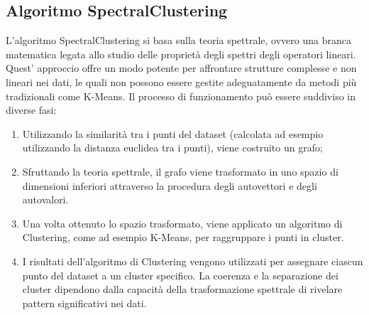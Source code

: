 \documentclass[12pt,oneside]{article}
\begin{document}
    \begin{enumerate}
    \subsection{Algoritmo SpectralClustering}
    \begin{justify}
    L'algoritmo SpectralClustering si basa sulla teoria spettrale, ovvero una branca matematica legata allo studio delle proprietà degli spettri degli operatori lineari. Quest' approccio offre un modo potente per affrontare strutture complesse e non lineari nei dati, le quali non possono essere gestite adeguatamente da metodi più tradizionali come K-Means. 
    Il processo di funzionamento può essere suddiviso in diverse fasi:
    \begin{enumerate}[label=\arabic*)]
        \item Utilizzando la similarità tra i punti del dataset (calcolata ad esempio utilizzando la distanza euclidea tra i punti), viene costruito un grafo;
        \item Sfruttando la teoria spettrale, il grafo viene trasformato in uno spazio di dimensioni inferiori attraverso la procedura degli autovettori e degli autovalori.
        \item Una volta ottenuto lo spazio trasformato, viene applicato un algoritmo di Clustering, come ad esempio K-Means, per raggruppare i punti in cluster. 
        \item I risultati dell'algoritmo di Clustering vengono utilizzati per assegnare ciascun punto del dataset a un cluster specifico. La coerenza e la separazione dei cluster dipendono dalla capacità della trasformazione spettrale di rivelare pattern significativi nei dati.
    \end{enumerate}
    \end{justify}
    \end{enumerate}
\end{document}

